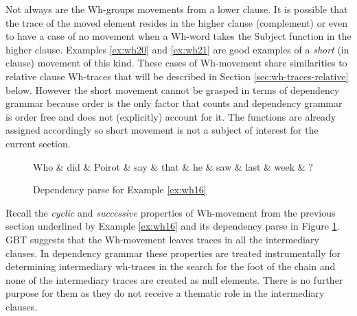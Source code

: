     Not always are the Wh-groups movements from a lower clause. It is possible that the trace of the moved element resides in the higher clause (complement) or even to have a case of no movement when a Wh-word takes the Subject function in the higher clause. Examples \ref{ex:wh20} and \ref{ex:wh21} are good examples of a \textit{short} (in clause) movement of this kind. These cases of Wh-movement share similarities to relative clause Wh-traces that will be described in Section \ref{sec:wh-traces-relative} below. However the short movement cannot be grasped in terms of dependency grammar because order is the only factor that counts and dependency grammar is order free and does not (explicitly) account for it. The functions are already assigned accordingly so short movement is not a subject of interest for the current section.

    \begin{figure}[H]
    	\centering
    	\begin{dependency}
    		\begin{deptext}[]
    			Who \& did \& Poirot \& say \& that \& he \& saw \& last \& week \& ?\\
    		\end{deptext}
    	\end{dependency}
    	\caption{Dependency parse for Example \ref{ex:wh16}}
    	\label{fig:e17}
    \end{figure}

    Recall the \textit{cyclic} and \textit{successive} properties of Wh-movement from the previous section underlined by Example \ref{ex:wh16} and its dependency parse in Figure \ref{fig:e17}. GBT suggests that the Wh-movement leaves traces in all the intermediary clauses. In dependency grammar these properties are treated instrumentally for determining intermediary wh-traces in the search for the foot of the chain and none of the intermediary traces are created as null elements. There is no further purpose for them as they do not receive a thematic role in the intermediary clauses. 

